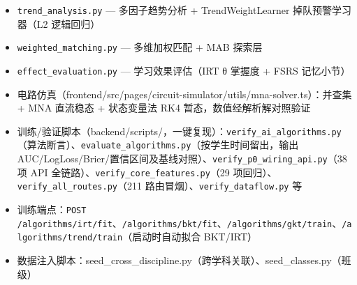 \documentclass[zihao=-4,a4paper,UTF8,fontset=windows]{ctexart}
\begin{document}
\begin{itemize}[leftmargin=2em,itemsep=0pt,topsep=0pt]
\item \texttt{trend\_\allowbreak{}analysis.\allowbreak{}py} — 多因子趋势分析 + TrendWeightLearner 掉队预警学习器（L2 逻辑回归）
\end{itemize}
\begin{itemize}[leftmargin=2em,itemsep=0pt,topsep=0pt]
\item \texttt{weighted\_\allowbreak{}matching.\allowbreak{}py} — 多维加权匹配 + MAB 探索层
\end{itemize}
\begin{itemize}[leftmargin=2em,itemsep=0pt,topsep=0pt]
\item \texttt{effect\_\allowbreak{}evaluation.\allowbreak{}py} — 学习效果评估（IRT θ 掌握度 + FSRS 记忆小节）
\end{itemize}
\begin{itemize}[leftmargin=2em,itemsep=0pt,topsep=0pt]
\item 电路仿真（frontend/src/pages/circuit-simulator/utils/mna-solver.ts）：并查集 + MNA 直流稳态 + 状态变量法 RK4 暂态，数值经解析解对照验证
\end{itemize}
\begin{itemize}[leftmargin=2em,itemsep=0pt,topsep=0pt]
\item 训练/验证脚本（backend/scripts/，一键复现）：\texttt{verify\_\allowbreak{}ai\_\allowbreak{}algorithms.\allowbreak{}py}（算法断言）、\texttt{evaluate\_\allowbreak{}algorithms.\allowbreak{}py}（按学生时间留出，输出 AUC/LogLoss/Brier/置信区间及基线对照）、\texttt{verify\_\allowbreak{}p0\_\allowbreak{}wiring\_\allowbreak{}api.\allowbreak{}py}（38 项 API 全链路）、\texttt{verify\_\allowbreak{}core\_\allowbreak{}features.\allowbreak{}py}（29 项回归）、\texttt{verify\_\allowbreak{}all\_\allowbreak{}routes.\allowbreak{}py}（211 路由冒烟）、\texttt{verify\_\allowbreak{}dataflow.\allowbreak{}py} 等
\end{itemize}
\begin{itemize}[leftmargin=2em,itemsep=0pt,topsep=0pt]
\item 训练端点：\texttt{POST /\allowbreak{}algorithms/\allowbreak{}irt/\allowbreak{}fit}、\texttt{/\allowbreak{}algorithms/\allowbreak{}bkt/\allowbreak{}fit}、\texttt{/\allowbreak{}algorithms/\allowbreak{}gkt/\allowbreak{}train}、\texttt{/\allowbreak{}algorithms/\allowbreak{}trend/\allowbreak{}train}（启动时自动拟合 BKT/IRT）
\end{itemize}
\begin{itemize}[leftmargin=2em,itemsep=0pt,topsep=0pt]
\item 数据注入脚本：seed\_cross\_discipline.py（跨学科关联）、seed\_classes.py（班级）
\end{itemize}
\end{document}

